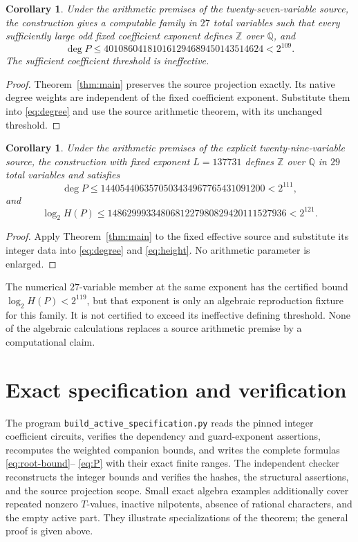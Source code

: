 \documentclass[11pt,a4paper]{article}
\newtheorem{corollary}[theorem]{Corollary}
\newcommand{\Q}{\mathbb Q}\newcommand{\Z}{\mathbb Z}
\begin{document}
\begin{corollary}\label{cor:27}
Under the arithmetic premises of the twenty-seven-variable source,
the construction gives a computable family in $27$ total variables
such that every sufficiently large odd fixed coefficient exponent
defines $\Z$ over $\Q$, and
\[
 \deg P\le401086041810161294689450143514624<2^{109}.
\]
The sufficient coefficient threshold is ineffective.
\end{corollary}
\begin{proof}
Theorem~\ref{thm:main} preserves the source projection exactly.
Its native degree weights are independent of the fixed coefficient
exponent. Substitute them into \eqref{eq:degree} and use the
source arithmetic theorem, with its unchanged threshold.
\end{proof}

\begin{corollary}\label{cor:29}
Under the arithmetic premises of the explicit twenty-nine-variable
source, the construction with fixed exponent $L=137731$ defines
$\Z$ over $\Q$ in $29$ total variables and satisfies
\[
 \deg P\le1440544063570503434967765431091200<2^{111},
\]
and
\[
 \log_2 H(P)\le
 1486299933480681227980829420111527936<2^{121}.
\]
\end{corollary}
\begin{proof}
Apply Theorem~\ref{thm:main} to the fixed effective source and
substitute its integer data into \eqref{eq:degree} and
\eqref{eq:height}. No arithmetic parameter is enlarged.
\end{proof}

The numerical $27$-variable member at the same exponent has the
certified bound $\log_2 H(P)<2^{119}$, but that exponent is only
an algebraic reproduction fixture for this family. It is not
certified to exceed its ineffective defining threshold.
None of the algebraic calculations replaces a source arithmetic
premise by a computational claim.

\section{Exact specification and verification}

The program \nolinkurl{build_active_specification.py} reads the
pinned integer coefficient circuits, verifies the dependency and
guard-exponent assertions, recomputes the weighted companion
bounds, and writes the complete formulas \eqref{eq:root-bound}--%
\eqref{eq:P} with their exact finite ranges.
The independent checker reconstructs the integer bounds and
verifies the hashes, the structural assertions, and the source
projection scope. Small exact algebra examples additionally cover
repeated nonzero $T$-values, inactive nilpotents, absence of rational
characters, and the empty active part. They illustrate specializations
of the theorem; the general proof is given above.
\end{document}
